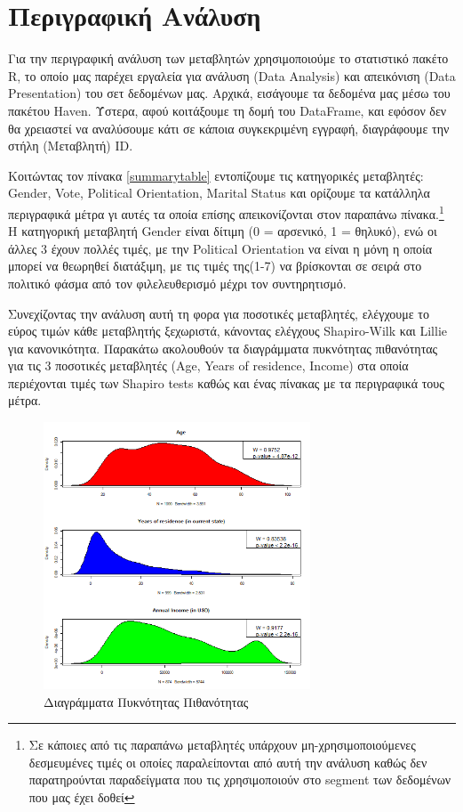 \documentclass[10pt, letterpaper]{article}
\begin{document}
        \section{Περιγραφική Ανάλυση}

        \par Για την περιγραφική ανάλυση των μεταβλητών χρησιμοποιούμε το στατιστικό πακέτο R, το οποίο μας παρέχει εργαλεία για ανάλυση (Data Analysis) και απεικόνιση (Data Presentation) του σετ δεδομένων μας. Αρχικά, εισάγουμε τα δεδομένα μας μέσω του πακέτου Haven. Ύστερα, αφού κοιτάξουμε τη δομή του DataFrame, και εφόσον δεν θα χρειαστεί να αναλύσουμε κάτι σε κάποια συγκεκριμένη εγγραφή, διαγράφουμε την στήλη (Μεταβλητή) ID.

        \par Κοιτώντας τον πίνακα \ref{summarytable} εντοπίζουμε τις κατηγορικές μεταβλητές: Gender, Vote, Political Orientation, Marital Status και ορίζουμε τα κατάλληλα περιγραφικά μέτρα γι αυτές τα οποία επίσης απεικονίζονται στον παραπάνω πίνακα.\footnote{Σε κάποιες από τις παραπάνω μεταβλητές υπάρχουν μη-χρησιμοποιούμενες δεσμευμένες τιμές οι οποίες παραλείπονται από αυτή την ανάλυση καθώς δεν παρατηρούνται παραδείγματα που τις χρησιμοποιούν στο segment των δεδομένων που μας έχει δοθεί} Η κατηγορική μεταβλητή Gender είναι δίτιμη (0 = αρσενικό, 1 = θηλυκό), ενώ οι άλλες 3 έχουν πολλές τιμές, με την Political Orientation να είναι η μόνη η οποία μπορεί να θεωρηθεί διατάξιμη, με τις τιμές της(1-7) να βρίσκονται σε σειρά στο πολιτικό φάσμα από τον φιλελευθερισμό μέχρι τον συντηρητισμό.

        \par Συνεχίζοντας την ανάλυση αυτή τη φορα για ποσοτικές μεταβλητές, ελέγχουμε το εύρος τιμών κάθε μεταβλητής ξεχωριστά, κάνοντας ελέγχους Shapiro-Wilk\cite{shapiro} και Lillie\cite{lillie} για κανονικότητα. Παρακάτω ακολουθούν τα διαγράμματα πυκνότητας πιθανότητας για τις 3 ποσοτικές μεταβλητές (Age, Years of residence, Income) στα οποία περιέχονται τιμές των Shapiro tests καθώς και ένας πίνακας με τα περιγραφικά τους μέτρα.

        \begin{figure}[h!]
                \caption{Διαγράμματα Πυκνότητας Πιθανότητας}
                \label{densityplots}
                \centering
                \includegraphics[width=300px, keepaspectratio]{resources/Density_Plots.png}
        \end{figure}
    
\end{document}
